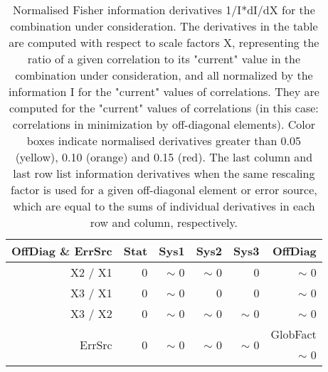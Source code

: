 \begin{table}[H]
\scriptsize
\begin{center}
\renewcommand{\arraystretch}{1.1}
\begin{tabular}{|r|rrrr|r|}
\hline
 OffDiag \& ErrSrc & {\tiny Stat} & {\tiny Sys1} & {\tiny Sys2} & {\tiny Sys3} & OffDiag\\
\hline
X2 / X1 &  0 &  {\tiny $\sim$ }0 &  {\tiny $\sim$ }0 &  0 &  {\tiny $\sim$ }0 \\
X3 / X1 &  0 &  {\tiny $\sim$ }0 &  0 &  0 &  {\tiny $\sim$ }0 \\
X3 / X2 &  0 &  {\tiny $\sim$ }0 &  {\tiny $\sim$ }0 &  {\tiny $\sim$ }0 &  {\tiny $\sim$ }0 \\
\hline
\multirow{2}{*}{ErrSrc} & \multirow{2}{*}{ 0} & \multirow{2}{*}{ {\tiny $\sim$ }0} & \multirow{2}{*}{ {\tiny $\sim$ }0} & \multirow{2}{*}{ {\tiny $\sim$ }0} & GlobFact\\
 & & & & &  {\tiny $\sim$ }0 \\
\hline
\end{tabular}
\renewcommand{\arraystretch}{1}
\caption{Normalised Fisher information derivatives 1/I*dI/dX for the combination under consideration. The derivatives in the table are computed with respect to scale factors X, representing the ratio of a given correlation to its "current" value in the combination under consideration, and all normalized by the information I for the "current" values of correlations. They are computed for the "current" values of correlations (in this case: correlations in minimization by off-diagonal elements). Color boxes indicate normalised derivatives greater than 0.05 (yellow), 0.10 (orange) and 0.15 (red). The last column and last row list information derivatives when the same rescaling factor is used for a given off-diagonal element or error source, which are equal to the sums of individual derivatives in each row and column, respectively.}
\end{center}
\end{table}
